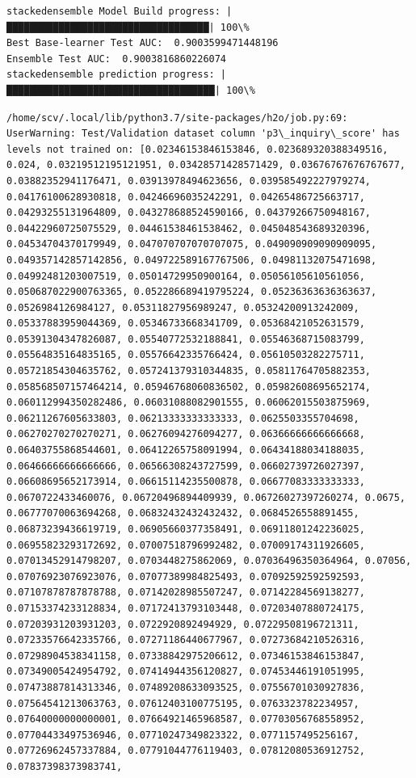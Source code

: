 \documentclass[11pt]{article}
\begin{document}
    \begin{Verbatim}[commandchars=\\\{\}]
stackedensemble Model Build progress: |███████████████████████████████████| 100\%
Best Base-learner Test AUC:  0.9003599471448196
Ensemble Test AUC:  0.9003816860226074
stackedensemble prediction progress: |████████████████████████████████████| 100\%

    \end{Verbatim}

    \begin{Verbatim}[commandchars=\\\{\}]
/home/scv/.local/lib/python3.7/site-packages/h2o/job.py:69: UserWarning: Test/Validation dataset column 'p3\_inquiry\_score' has levels not trained on: [0.02346153846153846, 0.023689320388349516, 0.024, 0.03219512195121951, 0.03428571428571429, 0.03676767676767677, 0.03882352941176471, 0.03913978494623656, 0.039585492227979274, 0.04176100628930818, 0.04246696035242291, 0.04265486725663717, 0.04293255131964809, 0.043278688524590166, 0.04379266750948167, 0.04422960725075529, 0.04461538461538462, 0.045048543689320396, 0.04534704370179949, 0.047070707070707075, 0.049090909090909095, 0.049357142857142856, 0.049722589167767506, 0.04981132075471698, 0.04992481203007519, 0.05014729950900164, 0.05056105610561056, 0.050687022900763365, 0.052286689419795224, 0.05236363636363637, 0.0526984126984127, 0.05311827956989247, 0.05324200913242009, 0.05337883959044369, 0.05346733668341709, 0.05368421052631579, 0.05391304347826087, 0.05540772532188841, 0.05546368715083799, 0.05564835164835165, 0.05576642335766424, 0.05610503282275711, 0.05721854304635762, 0.057241379310344835, 0.05811764705882353, 0.058568507157464214, 0.05946768060836502, 0.05982608695652174, 0.060112994350282486, 0.06031088082901555, 0.06062015503875969, 0.06211267605633803, 0.06213333333333333, 0.0625503355704698, 0.06270270270270271, 0.06276094276094277, 0.06366666666666668, 0.06403755868544601, 0.06412265758091994, 0.06434188034188035, 0.06466666666666666, 0.06566308243727599, 0.06602739726027397, 0.06608695652173914, 0.06615114235500878, 0.06677083333333333, 0.0670722433460076, 0.06720496894409939, 0.06726027397260274, 0.0675, 0.06777070063694268, 0.06832432432432432, 0.0684526558891455, 0.06873239436619719, 0.06905660377358491, 0.06911801242236025, 0.06955823293172692, 0.07007518796992482, 0.07009174311926605, 0.07013452914798207, 0.0703448275862069, 0.07036496350364964, 0.07056, 0.07076923076923076, 0.07077389984825493, 0.07092592592592593, 0.07107878787878788, 0.07142028985507247, 0.07142284569138277, 0.07153374233128834, 0.07172413793103448, 0.07203407880724175, 0.07203931203931203, 0.0722920892494929, 0.07229508196721311, 0.07233576642335766, 0.07271186440677967, 0.07273684210526316, 0.07298904538341158, 0.07338842975206612, 0.07346153846153847, 0.07349005424954792, 0.07414944356120827, 0.07453446191051995, 0.07473887814313346, 0.07489208633093525, 0.07556701030927836, 0.07564541213063763, 0.07612403100775195, 0.0763323782234957, 0.07640000000000001, 0.07664921465968587, 0.07703056768558952, 0.07704433497536946, 0.07710247349823322, 0.0771157495256167, 0.07726962457337884, 0.07791044776119403, 0.07812080536912752, 0.07837398373983741, 
\end{Verbatim}
\end{document}

